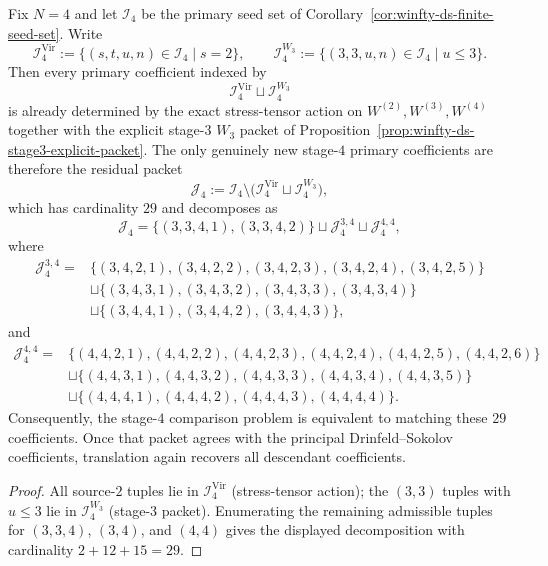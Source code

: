 \begin{proposition}
\label{prop:winfty-ds-stage4-residual-packet}
\ClaimStatusConditional
Fix $N=4$ and let $\mathcal{I}_4$ be the primary seed set of
Corollary~\ref{cor:winfty-ds-finite-seed-set}. Write
\[
\mathcal{I}_4^{\mathrm{Vir}}
:=\{(s,t,u,n)\in\mathcal{I}_4 \mid s=2\},
\qquad
\mathcal{I}_4^{W_3}
:=\{(3,3,u,n)\in\mathcal{I}_4 \mid u\le 3\}.
\]
Then every primary coefficient indexed by
\[
\mathcal{I}_4^{\mathrm{Vir}}\sqcup \mathcal{I}_4^{W_3}
\]
is already determined by the exact stress-tensor action on
$W^{(2)},W^{(3)},W^{(4)}$ together with the explicit stage-$3$
\texorpdfstring{$W_3$}{W3} packet of
Proposition~\ref{prop:winfty-ds-stage3-explicit-packet}. The only
genuinely new stage-$4$ primary coefficients are therefore the residual
packet
\[
\mathcal{J}_4
:=\mathcal{I}_4\setminus
\bigl(\mathcal{I}_4^{\mathrm{Vir}}\sqcup \mathcal{I}_4^{W_3}\bigr),
\]
which has cardinality $29$ and decomposes as
\[
\mathcal{J}_4
=\{(3,3,4,1),(3,3,4,2)\}
\sqcup \mathcal{J}_4^{3,4}
\sqcup \mathcal{J}_4^{4,4},
\]
where
\begin{align*}
\mathcal{J}_4^{3,4}
={} & \{(3,4,2,1),(3,4,2,2),(3,4,2,3),(3,4,2,4),(3,4,2,5)\} \\
& \sqcup \{(3,4,3,1),(3,4,3,2),(3,4,3,3),(3,4,3,4)\} \\
& \sqcup \{(3,4,4,1),(3,4,4,2),(3,4,4,3)\},
\end{align*}
and
\begin{align*}
\mathcal{J}_4^{4,4}
={} & \{(4,4,2,1),(4,4,2,2),(4,4,2,3),(4,4,2,4),(4,4,2,5),(4,4,2,6)\} \\
& \sqcup \{(4,4,3,1),(4,4,3,2),(4,4,3,3),(4,4,3,4),(4,4,3,5)\} \\
& \sqcup \{(4,4,4,1),(4,4,4,2),(4,4,4,3),(4,4,4,4)\}.
\end{align*}
Consequently, the stage-$4$ comparison problem is equivalent to
matching these $29$ coefficients. Once that packet agrees with the
principal Drinfeld--Sokolov coefficients, translation again recovers
all descendant coefficients.
\end{proposition}

\begin{proof}
All source-$2$ tuples lie in $\mathcal{I}_4^{\mathrm{Vir}}$ (stress-tensor action); the $(3,3)$ tuples with $u\le 3$ lie in $\mathcal{I}_4^{W_3}$ (stage-$3$ packet). Enumerating the remaining admissible tuples for $(3,3,4)$, $(3,4)$, and $(4,4)$ gives the displayed decomposition with cardinality $2+12+15=29$.
\end{proof}

